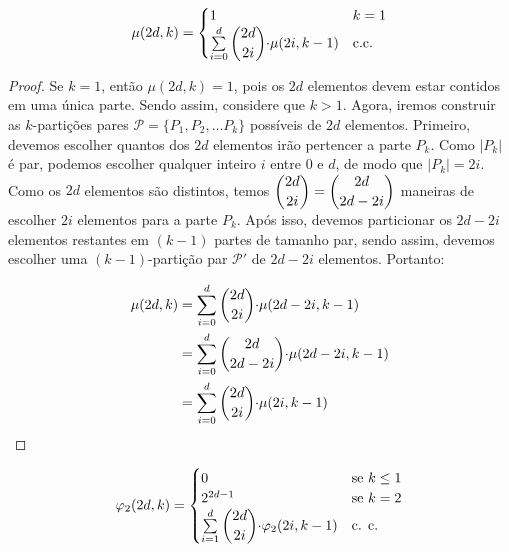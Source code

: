 \begin{lema}   
	\label{lema3}
	\begin{equation}
		\mu(2d, k) =
		\begin{cases}
			1 & \text{$k = 1$} \\
			\sum\limits_{i = 0}^{d} \escolhe{2d}{2i} {\cdot} \mu(2i, k-1) & \text{c.c.} \\ 
		\end{cases}
	\end{equation} 
\end{lema}

\begin{proof} 
	Se $k=1$, então $\mu(2d, k) = 1$, pois os $2d$ elementos devem estar contidos em uma única parte. Sendo assim, considere que $k > 1$. Agora, iremos construir as $k$-partições pares $\mathcal{P}=\{P_1, P_2, \ldots P_k\}$ possíveis de $2d$ elementos. Primeiro, devemos escolher quantos dos $2d$ elementos irão pertencer a parte $P_k$. Como $|P_k|$ é par, podemos escolher qualquer inteiro $i$ entre $0$ e $d$, de modo que $|P_k| = 2i$. Como os $2d$ elementos são distintos, temos $\escolhe{2d}{2i} = \escolhe{2d}{2d - 2i}$ maneiras de escolher $2i$ elementos para a parte $P_k$. Após isso, devemos particionar os $2d - 2i$ elementos restantes em $(k-1)$ partes de tamanho par, sendo assim, devemos escolher uma $(k-1)$-partição par $\mathcal{P'}$ de $2d - 2i$ elementos. Portanto: 
	
	\begin{align}
		\begin{split}
			\mu(2d, k) &= \sum\limits_{i = 0}^{d}\escolhe{2d}{2i} {\cdot} \mu(2d - 2i, k-1) \\
			&= \sum\limits_{i = 0}^{d}\escolhe{2d}{2d - 2i} {\cdot} \mu(2d - 2i, k-1)\\
			&= \sum\limits_{i = 0}^{d}\escolhe{2d}{2i} {\cdot} \mu(2i, k-1)  
		\end{split} 
	\end{align}  
\end{proof} \newl


\begin{lema}    
	\label{lema4}
	\begin{equation}
		\varphi_2(2d, k) =
		\begin{cases}
			0 & \text{se $k \leq 1$}\\
			2^{2d - 1} & \text{se $k = 2$} \\
			\sum\limits_{i = 1}^{d} \escolhe{2d}{2i} {\cdot} \varphi_2(2i, k-1) & \text{c. c.} \\ 
		\end{cases}
	\end{equation} 
\end{lema}

